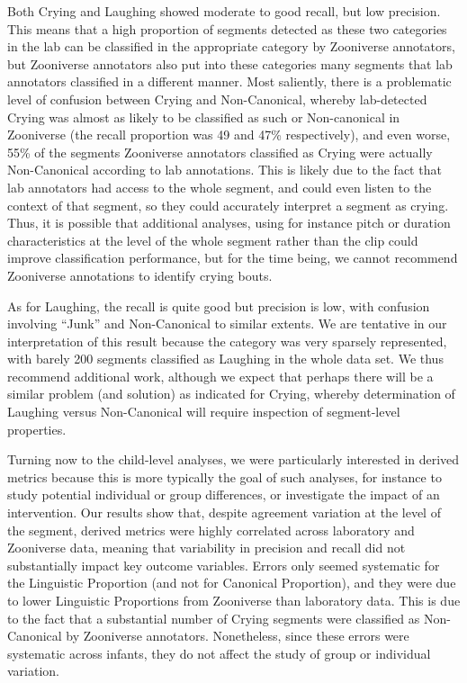 \documentclass[english,,man,floatsintext]{apa6}
\begin{document}
Both Crying and Laughing showed moderate to good recall, but low precision. This means that a high proportion of segments detected as these two categories in the lab can be classified in the appropriate category by Zooniverse annotators, but Zooniverse annotators also put into these categories many segments that lab annotators classified in a different manner. Most saliently, there is a problematic level of confusion between Crying and Non-Canonical, whereby lab-detected Crying was almost as likely to be classified as such or Non-canonical in Zooniverse (the recall proportion was 49 and 47\% respectively), and even worse, 55\% of the segments Zooniverse annotators classified as Crying were actually Non-Canonical according to lab annotations. This is likely due to the fact that lab annotators had access to the whole segment, and could even listen to the context of that segment, so they could accurately interpret a segment as crying. Thus, it is possible that additional analyses, using for instance pitch or duration characteristics at the level of the whole segment rather than the clip could improve classification performance, but for the time being, we cannot recommend Zooniverse annotations to identify crying bouts.

As for Laughing, the recall is quite good but precision is low, with confusion involving \enquote{Junk} and Non-Canonical to similar extents. We are tentative in our interpretation of this result because the category was very sparsely represented, with barely 200 segments classified as Laughing in the whole data set. We thus recommend additional work, although we expect that perhaps there will be a similar problem (and solution) as indicated for Crying, whereby determination of Laughing versus Non-Canonical will require inspection of segment-level properties.

Turning now to the child-level analyses, we were particularly interested in derived metrics because this is more typically the goal of such analyses, for instance to study potential individual or group differences, or investigate the impact of an intervention. Our results show that, despite agreement variation at the level of the segment, derived metrics were highly correlated across laboratory and Zooniverse data, meaning that variability in precision and recall did not substantially impact key outcome variables. Errors only seemed systematic for the Linguistic Proportion (and not for Canonical Proportion), and they were due to lower Linguistic Proportions from Zooniverse than laboratory data. This is due to the fact that a substantial number of Crying segments were classified as Non-Canonical by Zooniverse annotators. Nonetheless, since these errors were systematic across infants, they do not affect the study of group or individual variation.
\end{document}
